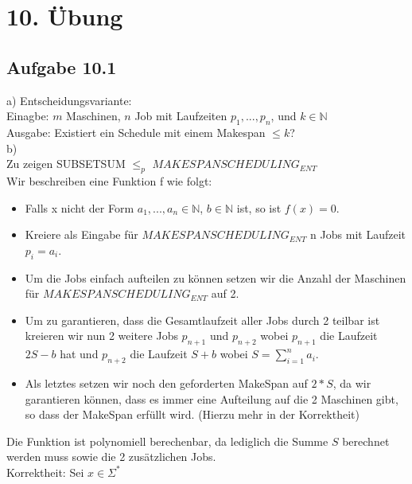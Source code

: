 \section*{10. Übung}
\subsection*{Aufgabe 10.1}
a) Entscheidungsvariante:\\
Einagbe: $m$ Maschinen, $n$ Job mit Laufzeiten $p_1,...,p_n$, und $k \in \mathbb{N}$\\
Ausgabe: Existiert ein Schedule mit einem Makespan $\le k$?\\

b)\\
Zu zeigen SUBSETSUM $\le_p$ $MAKESPANSCHEDULING_{ENT}$\\
Wir beschreiben eine Funktion f wie folgt:

\begin{itemize}
	\item Falls x nicht der Form $a_1,...,a_n \in \mathbb{N}$, $b \in \mathbb{N}$ ist, so ist $f(x) = 0$.
	\item Kreiere als Eingabe für $MAKESPANSCHEDULING_{ENT}$ n Jobs mit Laufzeit $p_i = a_i$.
	\item Um die Jobs einfach aufteilen zu können setzen wir die Anzahl der Maschinen für $MAKESPANSCHEDULING_{ENT}$ auf 2.
	\item Um zu garantieren, dass die Gesamtlaufzeit aller Jobs durch 2 teilbar ist kreieren wir nun 2 weitere Jobs $p_{n+1}$ und 
		$p_{n+2}$ wobei $p_{n+1}$ die Laufzeit $2S - b$ hat und $p_{n+2}$ die Laufzeit $S + b$ wobei $S = \sum_{i=1}^{n} a_i$.
	\item Als letztes setzen wir noch den geforderten MakeSpan auf $2*S$, da wir garantieren können, dass es immer eine Aufteilung
		auf die 2 Maschinen gibt, so dass der MakeSpan erfüllt wird. (Hierzu mehr in der Korrektheit)
\end{itemize}
Die Funktion ist polynomiell berechenbar, da lediglich die Summe $S$ berechnet werden muss sowie die 2 zusätzlichen Jobs.\\

Korrektheit: Sei $x \in \Sigma^{*}$

